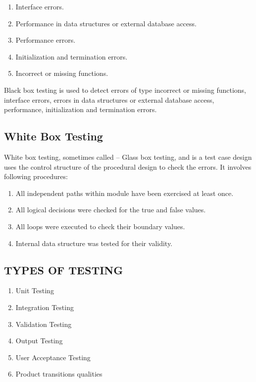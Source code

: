 \documentclass[11pt]{report} %
\begin{document}
\begin{enumerate}
	\item Interface errors.
	\item Performance in data structures or external database access.
	\item Performance errors.
	\item Initialization and termination errors.
	\item Incorrect or missing functions.
\end{enumerate}

Black box testing is used to detect errors of type incorrect or missing functions, interface errors, errors in data structures or external database access, performance, initialization and termination errors. 

\subsection{White Box Testing}
\label{subsec:White Box Testing}

White box testing, sometimes called -- Glass box testing, and is a test case design uses the control structure of the procedural design to check the errors. It involves following procedures: 

\begin{enumerate}
	\item All independent paths within module have been exercised at least once.
	\item All logical decisions were checked for the true and false values.
	\item All loops were executed to check their boundary values. 
	\item Internal data structure was tested for their validity. 
\end{enumerate}


\subsection{TYPES OF TESTING}
\label{subsec:TYPES OF TESTING}

\begin{enumerate}
	\item Unit Testing 
	\item Integration Testing
	\item Validation Testing 
	\item Output Testing 
	\item User Acceptance Testing 
	\item Product transitions qualities 
\end{enumerate}
\end{document}
